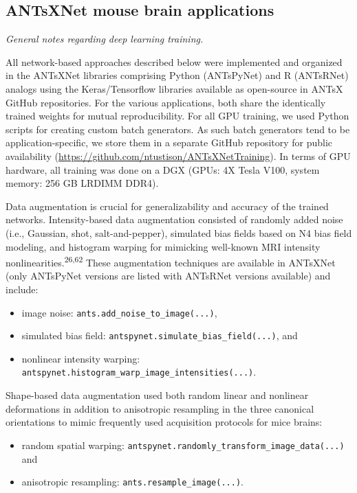 \documentclass[
  12pt,
]{article}
\begin{document}
\hypertarget{antsxnet-mouse-brain-applications}{%
\subsection*{ANTsXNet mouse brain
applications}\label{antsxnet-mouse-brain-applications}}

\emph{General notes regarding deep learning training.}

All network-based approaches described below were implemented and
organized in the ANTsXNet libraries comprising Python (ANTsPyNet) and R
(ANTsRNet) analogs using the Keras/Tensorflow libraries available as
open-source in ANTsX GitHub repositories. For the various applications,
both share the identically trained weights for mutual reproducibility.
For all GPU training, we used Python scripts for creating custom batch
generators. As such batch generators tend to be application-specific, we
store them in a separate GitHub repository for public availability
(\url{https://github.com/ntustison/ANTsXNetTraining}). In terms of GPU
hardware, all training was done on a DGX (GPUs: 4X Tesla V100, system
memory: 256 GB LRDIMM DDR4).

Data augmentation is crucial for generalizability and accuracy of the
trained networks. Intensity-based data augmentation consisted of
randomly added noise (i.e., Gaussian, shot, salt-and-pepper), simulated
bias fields based on N4 bias field modeling, and histogram warping for
mimicking well-known MRI intensity
nonlinearities.\textsuperscript{26,62} These augmentation techniques are
available in ANTsXNet (only ANTsPyNet versions are listed with ANTsRNet
versions available) and include:

\begin{itemize}
\item
  image noise: \texttt{ants.add\_noise\_to\_image(...)},
\item
  simulated bias field: \texttt{antspynet.simulate\_bias\_field(...)},
  and
\item
  nonlinear intensity warping:
  \texttt{antspynet.histogram\_warp\_image\_intensities(...)}.
\end{itemize}

Shape-based data augmentation used both random linear and nonlinear
deformations in addition to anisotropic resampling in the three
canonical orientations to mimic frequently used acquisition protocols
for mice brains:

\begin{itemize}
\item
  random spatial warping:
  \texttt{antspynet.randomly\_transform\_image\_data(...)} and
\item
  anisotropic resampling: \texttt{ants.resample\_image(...)}.
\end{itemize}
\end{document}
